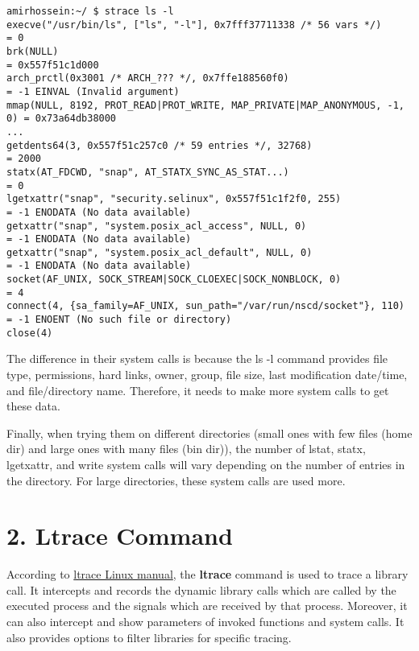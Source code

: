 \documentclass[12pt]{article}
\begin{document}
{\fontsize{8pt}{10pt}\selectfont
\begin{verbatim}
amirhossein:~/ $ strace ls -l
execve("/usr/bin/ls", ["ls", "-l"], 0x7fff37711338 /* 56 vars */)        = 0
brk(NULL)                                                                = 0x557f51c1d000
arch_prctl(0x3001 /* ARCH_??? */, 0x7ffe188560f0)                        = -1 EINVAL (Invalid argument)
mmap(NULL, 8192, PROT_READ|PROT_WRITE, MAP_PRIVATE|MAP_ANONYMOUS, -1, 0) = 0x73a64db38000
...
getdents64(3, 0x557f51c257c0 /* 59 entries */, 32768)                    = 2000
statx(AT_FDCWD, "snap", AT_STATX_SYNC_AS_STAT...)                        = 0
lgetxattr("snap", "security.selinux", 0x557f51c1f2f0, 255)               = -1 ENODATA (No data available)
getxattr("snap", "system.posix_acl_access", NULL, 0)                     = -1 ENODATA (No data available)
getxattr("snap", "system.posix_acl_default", NULL, 0)                    = -1 ENODATA (No data available)
socket(AF_UNIX, SOCK_STREAM|SOCK_CLOEXEC|SOCK_NONBLOCK, 0)               = 4
connect(4, {sa_family=AF_UNIX, sun_path="/var/run/nscd/socket"}, 110)    = -1 ENOENT (No such file or directory)
close(4) 
\end{verbatim}
}

The difference in their system calls is because the ls -l command provides file type, permissions, hard links, owner, group, file size, last modification date/time, and file/directory name. Therefore, it needs to make more system calls to get these data.

Finally, when trying them on different directories (small ones with few files (home dir) and large ones with many files (bin dir)), the number of lstat, statx, lgetxattr, and write system calls will vary depending on the number of entries in the directory. For large directories, these system calls are used more.

\newpage

\section{2. Ltrace Command}

According to \href{https://man7.org/linux/man-pages/man1/ltrace.1.html}{ltrace Linux manual}, the \textbf{ltrace} command is used to trace a library call. It intercepts and records the dynamic library calls which are called by the executed process and the signals which are received by that process.  Moreover, it can also intercept and show parameters of invoked functions and system calls. It also provides options to filter libraries for specific tracing.
\end{document}
